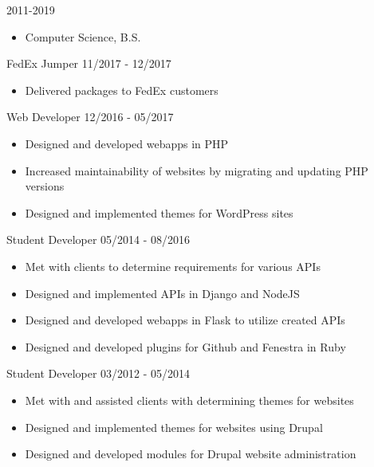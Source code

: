 \documentclass[11pt]{article} %
\begin{document}

\begin{description}
\squish
{}
           {}
           {2011-2019}

\begin{itemize}
  \item Computer Science, B.S.
\end{itemize}

\end{description}


\begin{description}
\squish
{}
           {FedEx Jumper}
           {11/2017 - 12/2017}

\begin{itemize}
  \item Delivered packages to FedEx customers
\end{itemize}

\squish
{}
           {Web Developer}
           {12/2016 - 05/2017}

\begin{itemize}
  \item Designed and developed webapps in PHP
  \item Increased maintainability of websites by migrating and updating PHP
    versions
  \item Designed and implemented themes for WordPress sites
\end{itemize}


           {Student Developer}
           {05/2014 - 08/2016}

\begin{itemize}
  \item Met with clients to determine requirements for various APIs
  \item Designed and implemented APIs in Django and NodeJS
  \item Designed and developed webapps in Flask to utilize created APIs
  \item Designed and developed plugins for Github and Fenestra in Ruby
\end{itemize}


           {Student Developer}
           {03/2012 - 05/2014}

\begin{itemize}
  \item Met with and assisted clients with determining themes for websites
  \item Designed and implemented themes for websites using Drupal 
  \item Designed and developed modules for Drupal website administration
\end{itemize}

\end{description}
\end{document}
